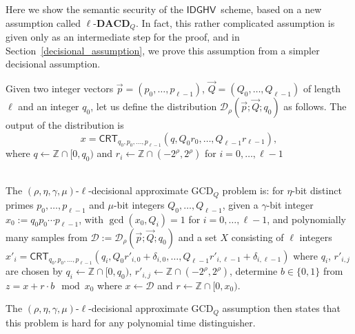 \documentclass{llncs}
\newcommand{\Z}{{\mathbb Z}}
\newcommand*{\crt}{\ensuremath{\mathsf{CRT}}}
\newcommand*{\CDGHV}{\ensuremath{\mathsf{IDGHV}}}
\newcommand*\D{\ensuremath{\mathcal D}}
\begin{document}
Here we show the semantic security of the \CDGHV\ scheme, based on a
new assumption called $\ell$-$\mathbf{DACD}_Q$.  In fact, this rather
complicated assumption is given only as an intermediate step for the
proof, and in Section~\ref{decisional_assumption}, we prove this
assumption from a simpler decisional assumption. 

Given two integer vectors $\vec{p}=(p_0, \dots, p_{\ell-1})$, $\vec{Q}=(Q_0, \dots, Q_{\ell-1})$ of length $\ell$ and an integer $q_0$, let us define the distribution $\D_\rho(\vec{p}; \vec{Q}; q_0)$ as follows.  The output of the distribution is
\[
x=\crt_{q_0,p_0,\dots,p_{\ell-1}}(q,Q_0r_0,\dots,Q_{\ell-1}r_{\ell-1}),
\]
where $q\gets\Z\cap[0,q_0)$ and $r_i\gets\Z\cap(-2^\rho,2^\rho)$ for $i=0,\dots,\ell-1$

\begin{definition} \\
The $(\rho,\eta,\gamma,\mu)$-$\ell$-decisional approximate GCD$_Q$ problem is: for $\eta$-bit distinct primes $p_0,\dots,p_{\ell-1}$ and $\mu$-bit integers $Q_0,\dots,Q_{\ell-1}$, given a $\gamma$-bit integer  $x_0:=q_0p_0\cdots p_{\ell-1}$, with $\gcd(x_0,Q_i)=1$ for $i=0,\dots,\ell-1$, and  %
polynomially many samples from $\D:=\D_{\rho}(\vec{p};\vec{Q};q_0)$ and a set $X$ consisting of $\ell$ integers $x'_i=\crt_{q_0,p_0,\dots,p_{\ell-1}}(q_i,Q_0r'_{i,0}+\delta_{i,0},\dots,Q_{\ell-1}r'_{i,\ell-1}+\delta_{i,\ell-1})$ where $q_i$, $r'_{i,j}$ are chosen by
$q_i\gets\Z\cap[0,q_0)$, $r'_{i,j}\gets\Z\cap(-2^\rho,2^\rho)$, determine $b\in\{0,1\}$ from $z=x+r\cdot b\mod x_0$ where $x\gets\D$ and $r\gets\Z\cap[0,x_0)$.
\end{definition}

The $(\rho,\eta,\gamma,\mu)$-$\ell$-decisional approximate GCD$_Q$ assumption then states that this problem is hard for any polynomial time distinguisher.
\end{document}
